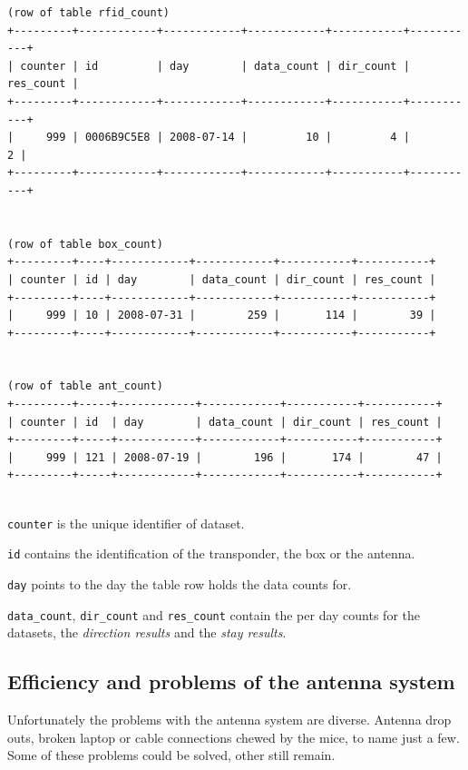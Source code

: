 \codescript
\begin{lstlisting}[frame=none]
(row of table rfid_count)
+---------+------------+------------+------------+-----------+-----------+
| counter | id         | day        | data_count | dir_count | res_count |
+---------+------------+------------+------------+-----------+-----------+
|     999 | 0006B9C5E8 | 2008-07-14 |         10 |         4 |         2 | 
+---------+------------+------------+------------+-----------+-----------+


(row of table box_count)
+---------+----+------------+------------+-----------+-----------+
| counter | id | day        | data_count | dir_count | res_count |
+---------+----+------------+------------+-----------+-----------+
|     999 | 10 | 2008-07-31 |        259 |       114 |        39 | 
+---------+----+------------+------------+-----------+-----------+


(row of table ant_count)
+---------+-----+------------+------------+-----------+-----------+
| counter | id  | day        | data_count | dir_count | res_count |
+---------+-----+------------+------------+-----------+-----------+
|     999 | 121 | 2008-07-19 |        196 |       174 |        47 | 
+---------+-----+------------+------------+-----------+-----------+


\end{lstlisting}

\begin{mydesc}
	\item \lstinline|counter| is the unique identifier of dataset.
	\item \lstinline|id| contains the identification of the transponder, the box or the antenna.
	\item \lstinline|day| points to the day the table row holds the data counts for.
	\item \lstinline|data_count|, \lstinline|dir_count| and \lstinline|res_count| contain the per day counts for the datasets, the \textit{direction results} and the \textit{stay results}.
\end{mydesc}

\subsection{Efficiency and problems of the antenna system}
\label{subsec:problems}

Unfortunately the problems with the antenna system are diverse. Antenna drop outs, broken laptop or cable connections chewed by the mice, to name just a few. Some of these problems could be solved, other still remain.

